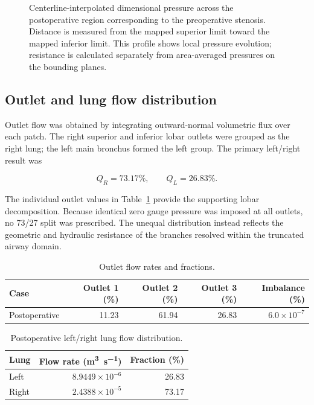 \documentclass[11pt,a4paper]{article}
\begin{document}
\begin{figure}[htbp]
  \centering
  \resizebox{0.95\textwidth}{!}{}
  \caption{Centerline-interpolated dimensional pressure across the postoperative
  region corresponding to the preoperative stenosis. Distance is measured from
  the mapped superior limit toward the mapped inferior limit. This profile shows
  local pressure evolution; resistance is calculated separately from
  area-averaged pressures on the bounding planes.}
  \label{fig:centerline_pressure}
\end{figure}

\subsection{Outlet and lung flow distribution}

Outlet flow was obtained by integrating outward-normal volumetric flux over each
patch. The right superior and inferior lobar outlets were grouped as the right
lung; the left main bronchus formed the left group. The primary left/right result
was

\begin{equation}
  Q_R = 73.17\%, \qquad Q_L = 26.83\%.
\end{equation}

The individual outlet values in Table~\ref{tab:outlet_flow} provide the supporting
lobar decomposition. Because identical zero gauge pressure was imposed at all
outlets, no 73/27 split was prescribed. The unequal distribution instead reflects
the geometric and hydraulic resistance of the branches resolved within the
truncated airway domain.

\begin{table}[htbp]
  \centering
  \caption{Outlet flow rates and fractions.}
  \label{tab:outlet_flow}
  \begin{tabular}{@{}lrrrr@{}}
    \toprule
    Case & Outlet 1 (\%) & Outlet 2 (\%) & Outlet 3 (\%) & Imbalance (\%) \\
    \midrule
    Postoperative & 11.23 & 61.94 & 26.83 & $6.0\times10^{-7}$ \\
    \bottomrule
  \end{tabular}
\end{table}

\begin{table}[htbp]
  \centering
  \caption{Postoperative left/right lung flow distribution.}
  \label{tab:lung_flow}
  \begin{tabular}{@{}lrr@{}}
    \toprule
    Lung & Flow rate (\si{\metre\cubed\per\second}) & Fraction (\%) \\
    \midrule
    Left  & $8.9449\times10^{-6}$ & 26.83 \\
    Right & $2.4388\times10^{-5}$ & 73.17 \\
    \bottomrule
  \end{tabular}
\end{table}
\end{document}
